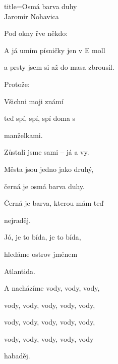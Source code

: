 \begin{song}{title=\predtitle\centering Osmá barva duhy \\\large Jaromír Nohavica  \vspace*{-0.3cm}}
{\begin{centerjustified}
\begin{varwidth}[t]{0.48\textwidth}


\sloka
	Pod okny řve někdo: 
	
	A já umím písničky jen v E moll
	
	a prsty jsem si až do masa zbrousil.
	
	Protože:
	

	Všichni moji známí
	
	teď spí, spí, spí doma s 

	manželkami.

	Zůstali jsme sami -- já a vy.
	
	Města jsou jedno jako druhý,
	
	černá je osmá barva duhy.
	
	Černá je barva, kterou mám teď 

	nejraděj.
	
	Jó, je to bída, je to bída,
	
	hledáme ostrov jménem 

	Atlantida.
	
	A nacházíme vody, vody, vody, 

	vody, vody, vody, vody, vody, 
	
	vody, vody, vody, vody, vody,

	vody, vody, vody, vody, vody

	habaděj. 

\end{varwidth}

\end{centerjustified}
}
\setcounter{Slokočet}{0}
\end{song}
